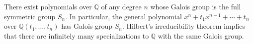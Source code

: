 There exist polynomials over $\mathbb{Q}$ of any degree $n$ whose Galois group is the full symmetric group $S_n$. In particular, the general polynomial $x^n + t_1 x^{n-1} + \cdots + t_n$ over $\mathbb{Q}(t_1, \ldots, t_n)$ has Galois group $S_n$. Hilbert's irreducibility theorem implies that there are infinitely many specializations to $\mathbb{Q}$ with the same Galois group.
